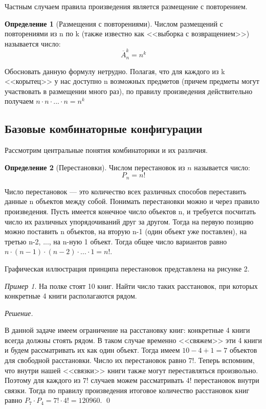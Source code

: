 \documentclass[12pt,a4paper]{article}
\theoremstyle{definition}
\newtheorem{definition}{Определение}[section]
\theoremstyle{definition}
\theoremstyle{remark}
\theoremstyle{corollary}
\newcommand{\nextblock}{\vspace{1.5em}\noindent}
\theoremstyle{bolditalic}
\newtheorem{example}{Пример}[section]
\newenvironment{solution}{
    \vspace{0.5em}
    \noindent\textit{Решение.}
}{\qed\vspace{1em}}
\begin{document}
\nextblock

Частным случаем правила произведения является размещение с повторением.

\begin{definition}[Размещения с повторениями] Числом размещений с повторениями из n по k (также известно как <<выборка с возвращением>>) называется число:
$$\overline{A}_n^k = n^k$$
\end{definition}

Обосновать данную формулу нетрудно. Полагая, что для каждого из k <<корытец>> у нас доступно n возможных предметов (причем предметы могут участвовать в размещении много раз), по правилу произведения действительно получаем $n \cdot n \cdot ... \cdot n = n^k$


\subsection{Базовые комбинаторные конфигурации}

Рассмотрим центральные понятия комбинаторики и их различия.

\begin{definition}[Перестановки]
Числом перестановок из $n$ называется число:
\[
P_n = n!
\]    
\end{definition}

Число перестановок --- это количество всех различных способов переставить данные n объектов между собой.
Понимать перестановки можно и через правило произведения. Пусть имеется конечное число объектов n, и требуется посчитать число их различных упорядочиваний друг за другом. Тогда на первую позицию можно поставить n объектов, на вторую n-1 (один объект уже поставлен), на третью n-2, ..., на n-ную 1 объект. Тогда общее число вариантов равно $n \cdot (n-1) \cdot (n-2) \cdot ... \cdot 1 = n!$.

\nextblock

Графическая иллюстрация принципа перестановок представлена на рисунке 2.


\begin{example}
    На полке стоят 10 книг. Найти число таких расстановок, при которых конкретные 4 книги располагаются рядом.
\end{example}
\begin{solution}
    В данной задаче имеем ограничение на расстановку книг: конкретные 4 книги всегда должны стоять рядом. В таком случае временно <<свяжем>> эти 4 книги и будем рассматривать их как один объект. Тогда имеем $10 - 4 + 1 = 7$ объектов для свободной расстановки. Число их перестановок равно $7!$. Теперь вспомним, что внутри нашей <<связки>> книги также могут переставляться произвольно. Поэтому для каждого из $7!$ случаев можем рассматривать $4!$ перестановок внутри связки. Тогда по правилу произведения итоговое количество расстановок книг равно $P_7 \cdot P_4 = 7!\cdot4!=120960$.
\end{solution}
\end{document}
